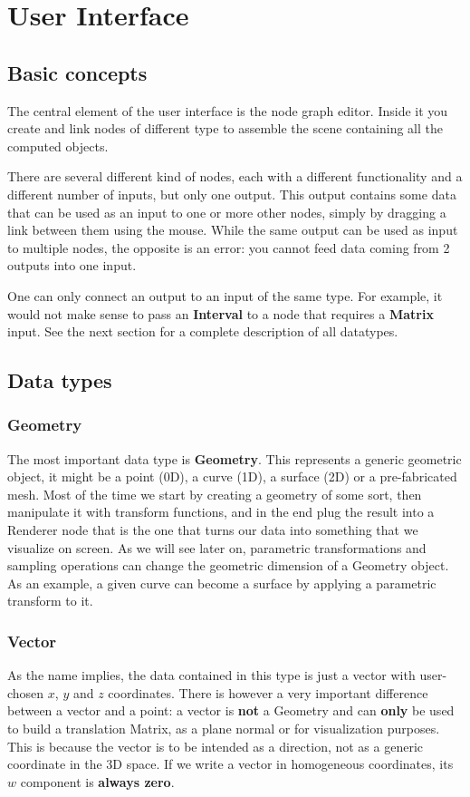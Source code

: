\chapter{User Interface}

\section{Basic concepts}

The central element of the user interface is the node graph editor. Inside it
you create and link nodes of different type to assemble the scene containing all
the computed objects.

There are several different kind of nodes, each with a different functionality
and a different number of inputs, but only one output. This output contains
some data that can be used as an input to one or more other nodes, simply by dragging a link
between them using the mouse. While the same output can be used as input to multiple nodes,
the opposite is an error: you cannot feed data coming from 2 outputs into one input.

One can only connect an output to an input of the same type. For example, it
would not make sense to pass an \textbf{Interval} to a node that requires
a \textbf{Matrix} input. See the next section for a complete description of
all datatypes.

\section{Data types}

\subsection{Geometry}
The most important data type is \textbf{Geometry}. This represents a generic geometric
object, it might be a point (0D), a curve (1D), a surface (2D) or a pre-fabricated mesh.
Most of the time we start by creating a geometry of some sort, then
manipulate it with transform functions, and in the end plug the result
into a Renderer node that is the one that turns our data into something
that we visualize on screen.
As we will see later on, parametric transformations and sampling operations
can change the geometric dimension of a Geometry object. As an example,
a given curve can become a surface by applying a parametric transform to it.

\subsection{Vector}
As the name implies, the data contained in this type is just a vector with
user-chosen $x$, $y$ and $z$ coordinates. There is however a very important
difference between a vector and a point: a vector is \textbf{not} a Geometry and
can \textbf{only} be used to build a translation Matrix, as a plane normal or for
visualization purposes. This is because the vector is to be intended as a direction,
not as a generic coordinate in the 3D space. If we write a vector
in homogeneous coordinates, its $w$ component is \textbf{always zero}.

